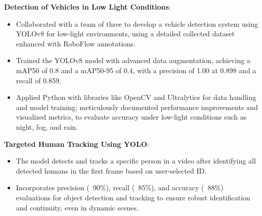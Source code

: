 \documentclass[a4paper,20pt]{article}
\newcommand{\resumeItem}[2]{
  \item\small{
    \textbf{#1}{: #2 \vspace{-2pt}}
  }
}
\newcommand{\resumeSubItem}[2]{\resumeItem{#1}{#2}\vspace{-3pt}}
\begin{document}
\resumeSubItem{Detection of Vehicles in Low Light Conditions} \hfill {January 2024 - May 2024} {
  \begin{itemize}
    \item Collaborated with a team of three to develop a vehicle detection system using YOLOv8 for low-light environments,
using a detailed collected dataset enhanced with RoboFlow annotations.
    \item Trained the YOLOv8 model with advanced data augmentation, achieving a mAP50 of 0.8 and a mAP50-95 of 0.4,
with a precision of 1.00 at 0.898 and a recall of 0.859.
    \item Applied Python with libraries like OpenCV and Ultralytics for data handling and model training; meticulously
documented performance improvements and visualized metrics, to evaluate accuracy under low-light conditions
such as night, fog, and rain.
  \end{itemize}
\vspace{2pt}
\resumeSubItem{Targeted Human Tracking Using YOLO} \hfill {February 2024 - June 2024} {
  \begin{itemize}
    \item The model detects and tracks a specific person in a video after identifying all detected humans in the first frame based on user-selected ID.
    \item Incorporates precision (~90\%), recall (~85\%), and accuracy (~88\%) evaluations for object detection and tracking to ensure robust identification and continuity, even in dynamic scenes.
  \end{itemize}
}
\vspace{2pt}


\vspace{-5pt}

}
\end{document}
